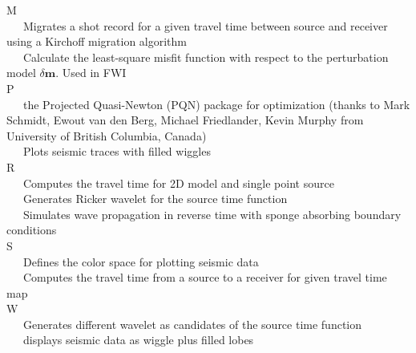 \documentclass[11pt,titlepage]{article}
\newcommand{\bm}{\boldsymbol{m}}
\theoremstyle{plain}
\theoremstyle{definition}
\theoremstyle{remark}
\numberwithin{equation}{section}
\begin{document}
\noindent M\\
~~~Migrates a shot record for a given travel time between source and receiver using a Kirchoff migration algorithm\\
~~~Calculate the least-square misfit function with respect to the perturbation model $\delta \bm$. Used in FWI\\

\noindent P\\
~~~the Projected Quasi-Newton (PQN) package for optimization (thanks to Mark Schmidt, Ewout van den Berg, Michael Friedlander, Kevin Murphy from University of British Columbia, Canada)\\
~~~Plots seismic traces with filled wiggles\\

\noindent R\\
~~~Computes the travel time for 2D model and single point source\\
~~~Generates Ricker wavelet for the source time function\\
~~~Simulates wave propagation in reverse time with sponge absorbing boundary conditions\\

\noindent S\\
~~~Defines the color space for plotting seismic data\\
~~~Computes the travel time from a source to a receiver for given travel time map\\

\noindent W\\
~~~Generates different wavelet as candidates of the source time function\\
~~~displays seismic data as wiggle plus filled lobes\\





\end{document}
